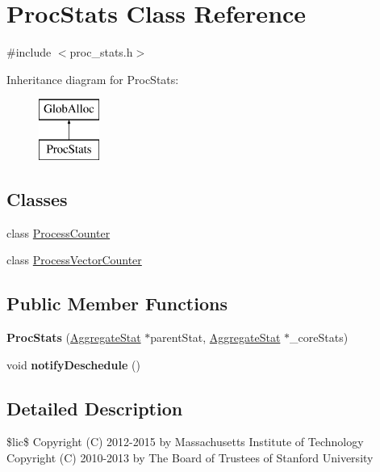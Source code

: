 \hypertarget{classProcStats}{\section{Proc\-Stats Class Reference}
\label{classProcStats}
}


{\ttfamily \#include $<$proc\-\_\-stats.\-h$>$}

Inheritance diagram for Proc\-Stats\-:\begin{figure}[H]
\begin{center}
\leavevmode
\includegraphics[height=2.000000cm]{classProcStats}
\end{center}
\end{figure}
\subsection*{Classes}
\begin{DoxyCompactItemize}
\item 
class \hyperlink{classProcStats_1_1ProcessCounter}{Process\-Counter}
\item 
class \hyperlink{classProcStats_1_1ProcessVectorCounter}{Process\-Vector\-Counter}
\end{DoxyCompactItemize}
\subsection*{Public Member Functions}
\begin{DoxyCompactItemize}
\item 
\hypertarget{classProcStats_a0c4b3a5811b28b7fea529b7c7173d6b1}{{\bfseries Proc\-Stats} (\hyperlink{classAggregateStat}{Aggregate\-Stat} $\ast$parent\-Stat, \hyperlink{classAggregateStat}{Aggregate\-Stat} $\ast$\-\_\-core\-Stats)}\label{classProcStats_a0c4b3a5811b28b7fea529b7c7173d6b1}

\item 
\hypertarget{classProcStats_aded6d74ec1487c3d0cd795f774bc8b54}{void {\bfseries notify\-Deschedule} ()}\label{classProcStats_aded6d74ec1487c3d0cd795f774bc8b54}

\end{DoxyCompactItemize}


\subsection{Detailed Description}
\$lic\$ Copyright (C) 2012-\/2015 by Massachusetts Institute of Technology Copyright (C) 2010-\/2013 by The Board of Trustees of Stanford University

